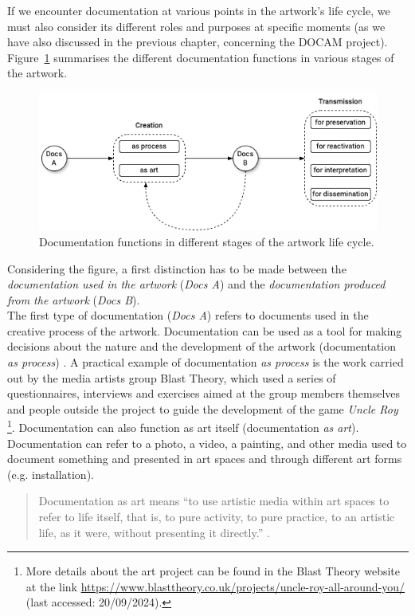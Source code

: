 If we encounter documentation at various points in the artwork’s life cycle, we must also consider its different roles and purposes at specific moments (as we have also discussed in the previous chapter, concerning the DOCAM project). Figure~\ref{fig:c2-documentation} summarises the different documentation functions in various stages of the artwork.
\begin{figure}[!h]
    \centering
    \includegraphics[width=\linewidth]{chapters/2-new_conservation_paradigms/image/graph02-documentation.png}
    \caption{Documentation functions in different stages of the artwork life cycle.}
    \label{fig:c2-documentation}
\end{figure}
Considering the figure, a first distinction has to be made between the \textit{documentation used in the artwork} (\textit{Docs A}) and the \textit{documentation produced from the artwork} (\textit{Docs B}).\\
The first type of documentation (\textit{Docs A}) refers to documents used in the creative process of the artwork. Documentation can be used as a tool for making decisions about the nature and the development of the artwork (documentation \textit{as process}) \cite{dekker2018collecting}. A practical example of documentation \textit{as process} is the work carried out by the media artists group Blast Theory, which used a series of questionnaires, interviews and exercises aimed at the group members themselves and people outside the project to guide the development of the game \textit{Uncle Roy} \footnote{More details about the art project can be found in the Blast Theory website at the link \url{https://www.blasttheory.co.uk/projects/uncle-roy-all-around-you/} (last accessed: 20/09/2024).}\cite{dekker2018collecting}. Documentation can also function as art itself (documentation \textit{as art}). Documentation can refer to a photo, a video, a painting, and other media used to document something and presented in art spaces and through different art forms (e.g. installation). 
\begin{quote}
    Documentation as art means “to use artistic media within art spaces to refer to life itself, that is, to pure activity, to pure practice, to an artistic life, as it were, without presenting it directly.” \cite{groys2008art}. 
\end{quote}
